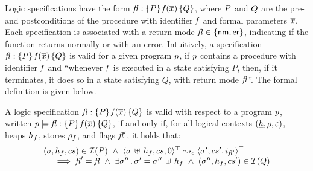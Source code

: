 \jsil Logic specifications have the form ${\mathit{fl}} : \{ P \} \, \mathit{f}(\overline{x}) \, \{ Q \}$, where $P$ and $Q$ are the 
pre- and postconditions of the procedure with identifier $\mathit{f}$ and formal parameters $\overline{x}$. 
Each specification is associated with a return mode $\mathit{fl} \in \{ {\sf nm}, {\sf er} \}$, indicating if the function
 returns normally or with an error. 
 Intuitively, a specification ${\mathit{fl}} : \{ P \} \, \mathit{f}(\overline{x}) \, \{ Q \}$ is 
valid for a given \jsil program $p$, if $p$ contains a procedure with identifier 
$\mathit{f}$ and ``whenever $\mathit{f}$ is executed in a state satisfying $P$, then, 
if it terminates, it does so in a state satisfying $Q$, with return mode $\mathit{fl}$''.
The formal definition is given below. 


\begin{definition}
A \jsil logic specification ${\mathit{fl}} : \{ P \} \, \mathit{f}(\overline{x}) \, \{ Q \}$ is valid with respect to a program 
$p$, written $p \models {\ensuremath{\mathit{fl}}} : \{ P \} \, \mathit{f}(\overline{x}) \, \{ Q \}$, if and only if, for all logical 
contexts $(\underline{h}, \rho, \varepsilon)$, heaps $h_f$, stores $\rho_f$, and flags $\mathit{fl}'$, it holds that: 
$$
\begin{array}{l}
   (\jstate, \heap_f, \cs) \in \interpret{}{}(P) 
   \ \wedge \ 
    \abssemrule{\jstate \dunion \heap_f, \cs, 0}{\jstate', \cs', i_{\flag'}}{\top}{\top}{\concrete} \\ \quad \
   \implies
      \flag' = \flag \ \wedge \ \exists \jstate'' \, . \, \jstate' = \jstate'' \dunion \heap_f
          \ \wedge \   (\jstate'', \heap_f, \cs') \in \interpret{}{}(Q) 
\end{array}
$$
\end{definition}

